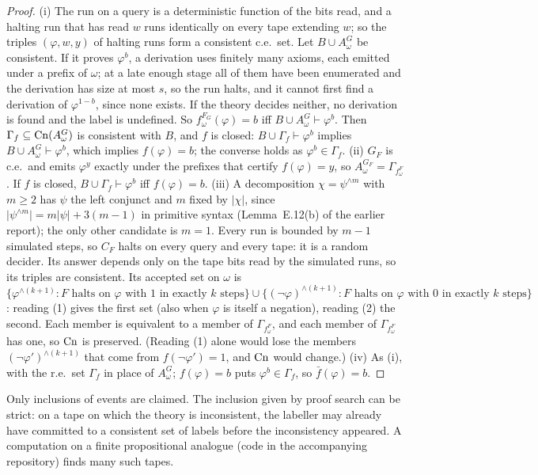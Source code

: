 \begin{proof}
(i) The run on a query is a deterministic function of the bits read, and a halting run that has read $w$ runs identically on every tape extending $w$; so the triples $(\varphi,w,y)$ of halting runs form a consistent c.e.\ set. Let $B\cup A^G_\omega$ be consistent. If it proves $\varphi^b$, a derivation uses finitely many axioms, each emitted under a prefix of $\omega$; at a late enough stage all of them have been enumerated and the derivation has size at most $s$, so the run halts, and it cannot first find a derivation of $\varphi^{1-b}$, since none exists. If the theory decides neither, no derivation is found and the label is undefined. So $f^{F_G}_\omega(\varphi)=b$ iff $B\cup A^G_\omega\vdash\varphi^b$. Then $\Gamma_{f}\subseteq\mathrm{Cn}(A^G_\omega)$ is consistent with $B$, and $f$ is closed: $B\cup\Gamma_f\vdash\varphi^b$ implies $B\cup A^G_\omega\vdash\varphi^b$, which implies $f(\varphi)=b$; the converse holds as $\varphi^b\in\Gamma_f$.
(ii) $G_F$ is c.e.\ and emits $\varphi^y$ exactly under the prefixes that certify $f(\varphi)=y$, so $A^{G_F}_\omega=\Gamma_{f^F_\omega}$. If $f$ is closed, $B\cup\Gamma_f\vdash\varphi^b$ iff $f(\varphi)=b$.
(iii) A decomposition $\chi=\psi^{\wedge m}$ with $m\ge2$ has $\psi$ the left conjunct and $m$ fixed by $\lvert\chi\rvert$, since $\lvert\psi^{\wedge m}\rvert=m\lvert\psi\rvert+3(m-1)$ in primitive syntax (Lemma~E.12(b) of the earlier report); the only other candidate is $m=1$. Every run is bounded by $m-1$ simulated steps, so $C_F$ halts on every query and every tape: it is a random decider. Its answer depends only on the tape bits read by the simulated runs, so its triples are consistent. Its accepted set on $\omega$ is $\{\varphi^{\wedge(k+1)}:F\text{ halts on }\varphi\text{ with }1\text{ in exactly }k\text{ steps}\}\cup\{(\neg\varphi)^{\wedge(k+1)}:F\text{ halts on }\varphi\text{ with }0\text{ in exactly }k\text{ steps}\}$: reading (1) gives the first set (also when $\varphi$ is itself a negation), reading (2) the second. Each member is equivalent to a member of $\Gamma_{f^F_\omega}$, and each member of $\Gamma_{f^F_\omega}$ has one, so $\mathrm{Cn}$ is preserved. (Reading (1) alone would lose the members $(\neg\varphi')^{\wedge(k+1)}$ that come from $f(\neg\varphi')=1$, and $\mathrm{Cn}$ would change.)
(iv) As (i), with the r.e.\ set $\Gamma_f$ in place of $A^G_\omega$; $f(\varphi)=b$ puts $\varphi^b\in\Gamma_f$, so $\bar f(\varphi)=b$.
\end{proof}

Only inclusions of events are claimed. The inclusion given by proof search can be strict: on a tape on which the theory is inconsistent, the labeller may already have committed to a consistent set of labels before the inconsistency appeared. A computation on a finite propositional analogue (code in the accompanying repository) finds many such tapes.

